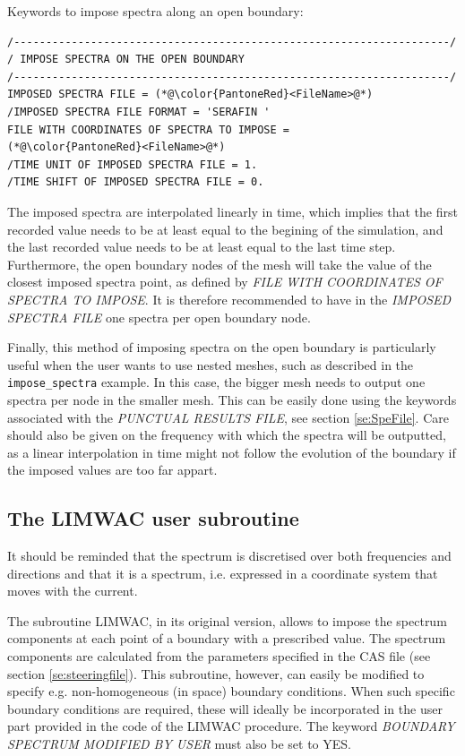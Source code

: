 \begin{CommentBlock}{Keywords to impose spectra along an open boundary:}
\lstset{language=TelemacCas,
        basicstyle=\scriptsize\ttfamily}
\begin{lstlisting}[frame=trBL]
/--------------------------------------------------------------------/
/ IMPOSE SPECTRA ON THE OPEN BOUNDARY
/--------------------------------------------------------------------/
IMPOSED SPECTRA FILE = (*@\color{PantoneRed}<FileName>@*)
/IMPOSED SPECTRA FILE FORMAT = 'SERAFIN '
FILE WITH COORDINATES OF SPECTRA TO IMPOSE =
(*@\color{PantoneRed}<FileName>@*)
/TIME UNIT OF IMPOSED SPECTRA FILE = 1.
/TIME SHIFT OF IMPOSED SPECTRA FILE = 0.
\end{lstlisting}
\end{CommentBlock}

The imposed spectra are interpolated linearly in time, which implies that the first recorded value needs to be at
least equal to the begining of the simulation, and the last recorded value needs to be at least equal to the last
time step. Furthermore, the open boundary nodes of the mesh will take the value of the closest imposed spectra
point, as defined by \textit{FILE WITH COORDINATES OF SPECTRA TO IMPOSE}. It is therefore recommended to have
in the \textit{IMPOSED SPECTRA FILE} one spectra per open boundary node.

Finally, this method of imposing spectra on the open boundary is particularly useful when the user wants to use
nested meshes, such as described in the \texttt{impose\_spectra} example. In this case, the bigger mesh
needs to output one spectra per node in the smaller mesh. This can be easily done using the keywords associated
with the \textit{PUNCTUAL RESULTS FILE}, see section \ref{se:SpeFile}. Care should also be given on the
frequency with which the spectra will be outputted, as a linear interpolation in time might not follow the
evolution of the boundary if the imposed values are too far appart.

\subsection{ The LIMWAC user subroutine}

 It should be reminded that the spectrum is discretised over both frequencies and directions and that it is a  spectrum, i.e. expressed in a coordinate system that moves with the current.

 The subroutine LIMWAC, in its original version, allows to impose the spectrum components at each point of a boundary with a prescribed value. The spectrum components are calculated from the parameters specified in the CAS file (see section \ref{se:steeringfile}). This subroutine, however, can easily be modified to specify e.g. non-homogeneous (in space) boundary conditions. When such specific boundary conditions are required, these will ideally be incorporated in the user part provided in the code of the LIMWAC procedure. The keyword \textit{BOUNDARY SPECTRUM MODIFIED BY USER} must also be set to YES.


